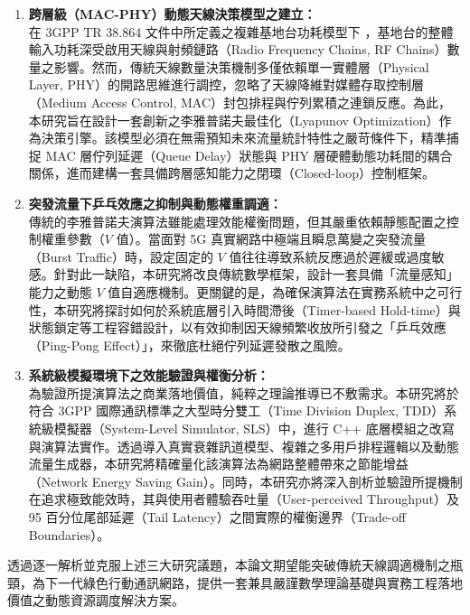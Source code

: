\begin{enumerate}
    \item \textbf{跨層級（MAC-PHY）動態天線決策模型之建立：}\\
    在 3GPP TR 38.864 文件中所定義之複雜基地台功耗模型下 \cite{3gpp2023_tr38864}，基地台的整體輸入功耗深受啟用天線與射頻鏈路（Radio Frequency Chains, RF Chains）數量之影響。然而，傳統天線數量決策機制多僅依賴單一實體層（Physical Layer, PHY）的開路思維進行調控，忽略了天線降維對媒體存取控制層（Medium Access Control, MAC）封包排程與佇列累積之連鎖反應。為此，本研究旨在設計一套創新之李雅普諾夫最佳化（Lyapunov Optimization）作為決策引擎。該模型必須在無需預知未來流量統計特性之嚴苛條件下，精準捕捉 MAC 層佇列延遲（Queue Delay）狀態與 PHY 層硬體動態功耗間的耦合關係，進而建構一套具備跨層感知能力之閉環（Closed-loop）控制框架。    

    \item \textbf{突發流量下乒乓效應之抑制與動態權重調適：}\\
    傳統的李雅普諾夫演算法雖能處理效能權衡問題，但其嚴重依賴靜態配置之控制權重參數（$V$ 值）。當面對 5G 真實網路中極端且瞬息萬變之突發流量（Burst Traffic）時，設定固定的 $V$ 值往往導致系統反應過於遲緩或過度敏感。針對此一缺陷，本研究將改良傳統數學框架，設計一套具備「流量感知」能力之動態 $V$ 值自適應機制。更關鍵的是，為確保演算法在實務系統中之可行性，本研究將探討如何於系統底層引入時間滯後（Timer-based Hold-time）與狀態鎖定等工程容錯設計，以有效抑制因天線頻繁收放所引發之「乒乓效應（Ping-Pong Effect）」，來徹底杜絕佇列延遲發散之風險。
    
    \item \textbf{系統級模擬環境下之效能驗證與權衡分析：}\\
    為驗證所提演算法之商業落地價值，純粹之理論推導已不敷需求。本研究將於符合 3GPP 國際通訊標準之大型時分雙工（Time Division Duplex, TDD）系統級模擬器（System-Level Simulator, SLS）中，進行 C++ 底層模組之改寫與演算法實作。透過導入真實衰雜訊道模型、複雜之多用戶排程邏輯以及動態流量生成器，本研究將精確量化該演算法為網路整體帶來之節能增益（Network Energy Saving Gain）。同時，本研究亦將深入剖析並驗證所提機制在追求極致能效時，其與使用者體驗吞吐量（User-perceived Throughput）及 95 百分位尾部延遲（Tail Latency）之間實際的權衡邊界（Trade-off Boundaries）。
\end{enumerate}

透過逐一解析並克服上述三大研究議題，本論文期望能突破傳統天線調適機制之瓶頸，為下一代綠色行動通訊網路，提供一套兼具嚴謹數學理論基礎與實務工程落地價值之動態資源調度解決方案。




